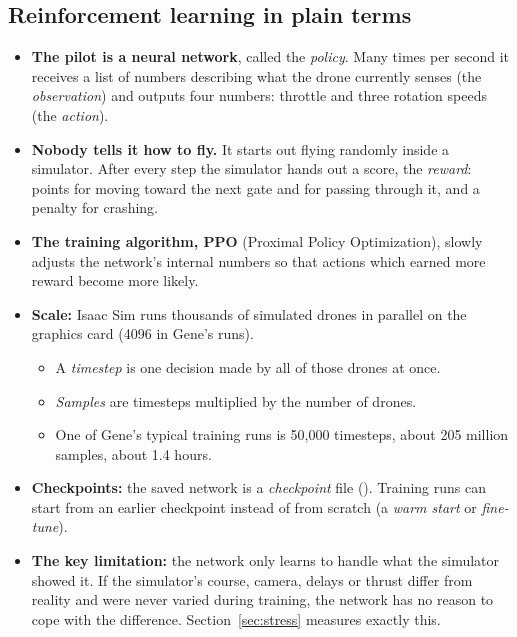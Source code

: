 \documentclass[10pt,a4paper]{article}
\newcommand{\code}[1]{\texttt{\detokenize{#1}}}
\begin{document}
\subsection{Reinforcement learning in plain terms}\label{sec:rl}
\begin{explain}
\begin{itemize}
\item \textbf{The pilot is a neural network}, called the \emph{policy}. Many times per second it receives a list of numbers describing what the drone currently senses (the \emph{observation}) and outputs four numbers: throttle and three rotation speeds (the \emph{action}).
\item \textbf{Nobody tells it how to fly.} It starts out flying randomly inside a simulator. After every step the simulator hands out a score, the \emph{reward}: points for moving toward the next gate and for passing through it, and a penalty for crashing.
\item \textbf{The training algorithm, PPO} (Proximal Policy Optimization), slowly adjusts the network's internal numbers so that actions which earned more reward become more likely.
\item \textbf{Scale:} Isaac Sim runs thousands of simulated drones in parallel on the graphics card (4096 in Gene's runs).
\begin{itemize}
\item A \emph{timestep} is one decision made by all of those drones at once.
\item \emph{Samples} are timesteps multiplied by the number of drones.
\item One of Gene's typical training runs is 50{,}000 timesteps, about 205 million samples, about 1.4 hours.
\end{itemize}
\item \textbf{Checkpoints:} the saved network is a \emph{checkpoint} file (\code{.pt}). Training runs can start from an earlier checkpoint instead of from scratch (a \emph{warm start} or \emph{fine-tune}).
\item \textbf{The key limitation:} the network only learns to handle what the simulator showed it. If the simulator's course, camera, delays or thrust differ from reality and were never varied during training, the network has no reason to cope with the difference. Section~\ref{sec:stress} measures exactly this.
\end{itemize}
\end{explain}
\end{document}
